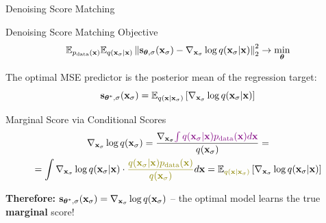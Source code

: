 \documentclass{beamer}
\renewcommand{\eqpause}{}
\renewcommand{\nextonslide}[1]{#1}
\begin{document}
\begin{frame}{Denoising Score Matching}
	\begin{block}{Denoising Score Matching Objective}
		\vspace{-0.3cm}
		\[
			\mathbb{E}_{p_{\text{data}}(\mathbf{x})} \mathbb{E}_{q(\mathbf{x}_{\sigma} | \mathbf{x})}\left\| \mathbf{s}_{\boldsymbol{\theta}, \sigma}(\mathbf{x}_{\sigma}) - \nabla_{\mathbf{x}_{\sigma}} \log q(\mathbf{x}_{\sigma} | \mathbf{x}) \right\|_2^2 \rightarrow \min_{\boldsymbol{\theta}}
		\]
		\vspace{-0.5cm}
	\end{block}
	\eqpause
	The optimal MSE predictor is the posterior mean of the regression target:
	\[
		\mathbf{s}_{\boldsymbol{\theta}^*, \sigma}(\mathbf{x}_\sigma) = \mathbb{E}_{q(\mathbf{x} | \mathbf{x}_\sigma)} \left[\nabla_{\mathbf{x}_\sigma} \log q(\mathbf{x}_\sigma | \mathbf{x}) \right]
	\]
	\eqpause
	\vspace{-0.5cm}
	\begin{block}{Marginal Score via Conditional Scores}
		\vspace{-0.5cm}
		\begin{multline*}
			\nabla_{\bx_\sigma} \log q(\bx_\sigma) = \frac{\nabla_{\bx_\sigma} {\color{violet}\int q(\bx_\sigma | \bx) \pd(\bx) d\bx}}{q(\bx_\sigma)}
			\nextonslide{= \\ = \int \nabla_{\bx_\sigma} \log q(\bx_\sigma | \bx) \cdot {\color{olive}\frac{q(\bx_\sigma | \bx) \pd(\bx)}{q(\bx_\sigma)}} d\bx}
			\nextonslide{= \bbE_{\color{olive}q(\bx | \bx_\sigma)} \left[\nabla_{\bx_\sigma} \log q(\bx_\sigma | \bx) \right]}
		\end{multline*}
		\vspace{-0.5cm}
	\end{block}
	\eqpause
	\textbf{Therefore:} $\mathbf{s}_{\boldsymbol{\theta}^*, \sigma}(\mathbf{x}_\sigma) = \nabla_{\mathbf{x}_\sigma} \log q(\mathbf{x}_\sigma)$ -- the optimal model learns the true \textbf{marginal} score!
\end{frame}
\end{document}
